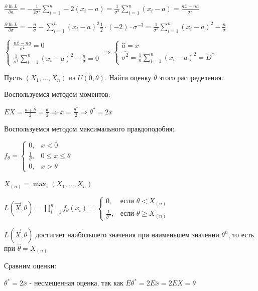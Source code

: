 \documentclass[12pt]{article}
\begin{document}
$\frac{\partial \ln L}{\partial a} = -\frac{1}{2\sigma^2} \sum_{i = 1}^n -2(x_i - a) = \frac{1}{\sigma^2} \sum_{i = 1}^n (x_i - a) = \frac{n\overline{x} - na}{\sigma^2}$

$\frac{\partial \ln L}{\partial \sigma} = -\frac{n}{\sigma} - \sum_{i = 1}^n (x_i - a)^2 \frac{1}{2} \cdot (-2) \cdot \sigma^{-3} = \frac{1}{\sigma^3} \sum_{i = 1}^n (x_i - a)^2 - \frac{n}{\sigma}$

$\begin{cases}
    \frac{n\overline{x} - na}{\sigma^2} = 0 \\
    \frac{1}{\sigma^3} \sum_{i = 1}^n (x_i - a)^2 - \frac{n}{\sigma} = 0
\end{cases} \Longrightarrow \begin{cases}
    \hat{a} = \overline{x} \\
    \widehat{\sigma^2} = \frac{1}{n} \sum_{i = 1}^n (x_i - a)^2 = D^*
\end{cases} $

 Пусть $(X_1, \dots, X_n)$ из $U(0, \theta)$. Найти оценку $\theta$ этого распределения.

Воспользуемся методом моментов:

$EX = \frac{a + b}{2} = \frac{\theta}{2} \Longrightarrow \overline{x} = \frac{\theta^*}{2} \Longrightarrow \theta^* = 2\overline{x}$

Воспользуемся методом максимального правдоподобия:

$f_\theta = \begin{cases}0, & x < 0 \\ \frac{1}{\theta}, & 0 \leq x \leq \theta \\ 0, & x > \theta \end{cases}$

$X_{(n)} = \max_i (X_1, \dots, X_n)$

$L(\vec{X}, \theta) = \prod_{i = 1}^n f_\theta (x_i) = 
\begin{cases}
    0, & \text{если } \theta < X_{(n)} \\ 
    \frac{1}{\theta^n}, & \text{если } \theta \geq X_{(n)}
\end{cases}$

$L(\vec{X}, \theta)$ достигает наибольшего значения при наименьшем значении $\theta^n$, то есть при $\hat{\theta} = X_{(n)}$

Сравним оценки:

$\theta^* = 2 \overline{x}$ - несмещенная оценка, так как $E\theta^* = 2E\overline{x} = 2E X = \theta$
\end{document}

